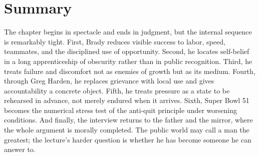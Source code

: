 \section{Summary}

The chapter begins in spectacle and ends in judgment, but the internal sequence is remarkably tight. First, Brady reduces visible success to labor, speed, teammates, and the disciplined use of opportunity. Second, he locates self-belief in a long apprenticeship of obscurity rather than in public recognition. Third, he treats failure and discomfort not as enemies of growth but as its medium. Fourth, through Greg Harden, he replaces grievance with local use and gives accountability a concrete object. Fifth, he treats pressure as a state to be rehearsed in advance, not merely endured when it arrives. Sixth, Super Bowl 51 becomes the numerical stress test of the anti-quit principle under worsening conditions. And finally, the interview returns to the father and the mirror, where the whole argument is morally completed. The public world may call a man the greatest; the lecture's harder question is whether he has become someone he can answer to.